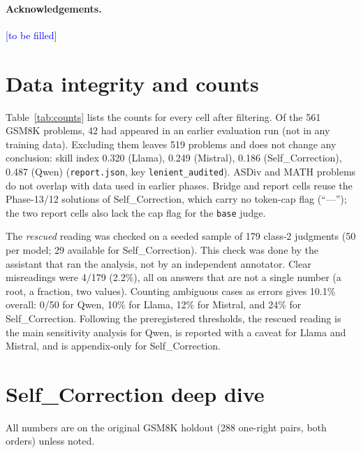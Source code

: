 \documentclass[11pt]{article}
\newcommand{\authorinfo}[1]{\textcolor{blue}{[#1]}}
\begin{document}
\paragraph{Acknowledgements.} \authorinfo{to be filled}




\appendix
\section{Data integrity and counts}
Table~\ref{tab:counts} lists the counts for every cell after filtering. Of the 561 GSM8K problems, 42 had
appeared in an earlier evaluation run (not in any training data). Excluding them leaves 519 problems and does
not change any conclusion: skill index 0.320 (Llama), 0.249 (Mistral), 0.186 (Self\_Correction), 0.487 (Qwen)
(\texttt{report.json}, key \texttt{lenient\_audited}). ASDiv and MATH problems do
not overlap with data used in earlier phases. Bridge and report cells reuse the Phase-13/12 solutions of
Self\_Correction, which carry no token-cap flag (``---''); the two report cells also lack the cap flag for the
\texttt{base} judge.

\begin{table}[h]
\centering\scriptsize
\caption{Counts per cell. Cap columns: share (\%) of solutions hitting the 768-token cap and of judgments
hitting the judge cap (\texttt{base}, \texttt{base\_c}).}
\label{tab:counts}

\end{table}

The \emph{rescued} reading was checked on a seeded sample of 179 class-2 judgments (50 per model; 29 available
for Self\_Correction). This check was done by the assistant that ran the analysis, not by an independent
annotator. Clear misreadings were 4/179 (2.2\%), all on answers that are not a single number (a root, a
fraction, two values). Counting ambiguous cases as errors gives 10.1\% overall: 0/50 for Qwen, 10\% for
Llama, 12\% for Mistral, and 24\% for Self\_Correction. Following the preregistered thresholds, the rescued
reading is the main sensitivity analysis for Qwen, is reported with a caveat for Llama and Mistral, and is
appendix-only for Self\_Correction.
\section{Self\_Correction deep dive}\label{app:sc}
All numbers are on the original GSM8K holdout (288 one-right pairs, both orders) unless noted.
\end{document}
